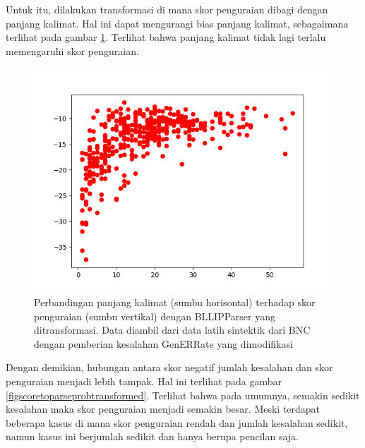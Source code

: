 \documentclass[conference]{IEEEtran}
\begin{document}
Untuk itu, dilakukan transformasi di mana skor penguraian dibagi dengan panjang kalimat. Hal ini dapat mengurangi bias panjang kalimat, sebagaimana terlihat pada gambar \ref{figlentoparseprobtransformed}. Terlihat bahwa panjang kalimat tidak lagi terlalu memengaruhi skor penguraian.

\begin{figure}[h]
\centerline{\includegraphics[width=\columnwidth]{figures/figlentoparseprobtransformed.png}}
\caption{Perbandingan panjang kalimat (sumbu horisontal) terhadap skor penguraian (sumbu vertikal) dengan BLLIPParser yang ditransformasi. Data diambil dari data latih sintektik dari BNC dengan pemberian kesalahan GenERRate yang dimodifikasi}
\label{figlentoparseprobtransformed}
\end{figure}

Dengan demikian, hubungan antara skor negatif jumlah kesalahan dan skor penguraian menjadi lebih tampak. Hal ini terlihat pada gambar \ref{figscoretoparseprobtransformed}. Terlihat bahwa pada umumnya, semakin sedikit kesalahan maka skor penguraian menjadi semakin besar. Meski terdapat beberapa kasus di mana skor penguraian rendah dan jumlah kesalahan sedikit, namun kasus ini berjumlah sedikit dan hanya berupa pencilan saja.
\end{document}
